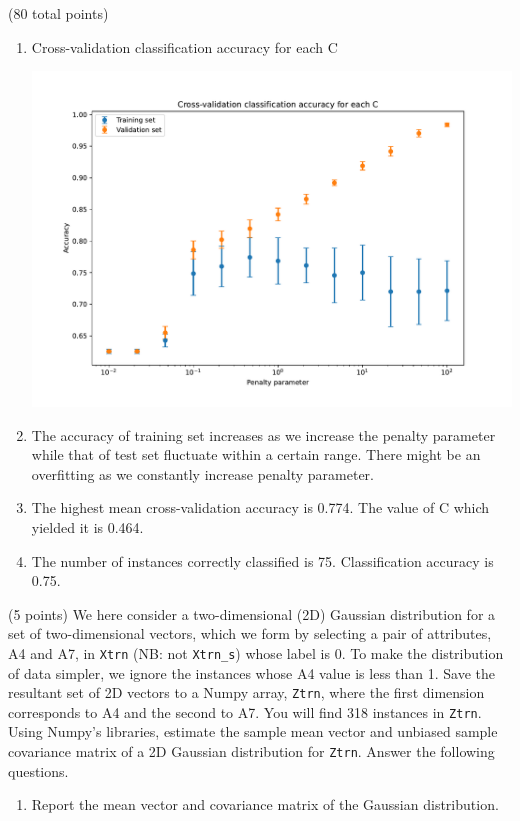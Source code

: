 \documentclass[12pt]{article}
\begin{document}
\begin{question}{(80 total points) \qOneTitle}
\begin{subquestion}
  \begin{answerbox}{0.65\textheight}
    \begin{enumerate}
    \item Cross-validation classification accuracy for each C
        \begin{center}
         \includegraphics[scale=0.6]{Cross-validation.pdf}
        \end{center}
    \item The accuracy of training set increases as we increase the penalty parameter while that of test set fluctuate within a certain range. There might be an overfitting as we constantly increase penalty parameter.
    \item The highest mean cross-validation accuracy is 0.774. The value of C which yielded it is 0.464.
    \item The number of instances correctly classified is 75. Classification accuracy is 0.75.
    \end{enumerate}
  \end{answerbox}
  


\end{subquestion}

\begin{subquestion}{(5 points)
    We here consider a two-dimensional (2D) Gaussian distribution for
    a set of two-dimensional vectors, which we form by 
    selecting a pair of attributes, A4 and A7, in {\tt Xtrn} (NB: not {\tt Xtrn\_s}) whose label is 0.
    To make the distribution of data simpler, we ignore the instances whose A4 value is less than 1. 
    Save the resultant set of 2D vectors to a Numpy array, {\tt Ztrn}, where the first dimension corresponds to A4 and the second to A7.
    You will find 318 instances in {\tt Ztrn}.
  } \label{q1:2d-gaussian}
  Using Numpy's libraries, estimate the sample mean vector and unbiased sample covariance matrix of a 2D Gaussian distribution for {\tt Ztrn}. Answer the following questions.
  \begin{enumerate}\NARROWITEM
  \item Report the mean vector and covariance matrix of the Gaussian distribution.


\end{enumerate}
\end{subquestion}
\end{question}
\end{document}
